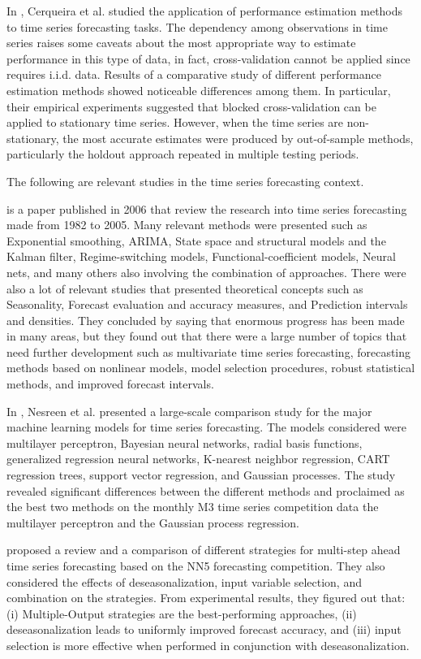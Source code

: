 In \cite{Cerqueira2020}, Cerqueira et al. studied the application of performance estimation methods to time series forecasting tasks.
The dependency among observations in time series raises some caveats about the most appropriate way to estimate performance in this type of data, in fact, cross-validation cannot be applied since requires i.i.d. data.
Results of a comparative study of different performance estimation methods showed noticeable differences among them.
In particular, their empirical experiments suggested that blocked cross-validation can be applied to stationary time series.
However, when the time series are non-stationary, the most accurate estimates were produced by out-of-sample methods, particularly the holdout approach repeated in multiple testing periods.

The following are relevant studies in the time series forecasting context.

\cite{DEGOOIJER2006443} is a paper published in 2006 that review the research into time series forecasting made from 1982 to 2005.
Many relevant methods were presented such as Exponential smoothing, ARIMA, State space and structural models and the Kalman filter, Regime-switching models, Functional-coefficient models, Neural nets, and many others also involving the combination of approaches.
There were also a lot of relevant studies that presented theoretical concepts such as Seasonality, Forecast evaluation and accuracy measures, and Prediction intervals and densities.
They concluded by saying that enormous progress has been made in many areas, but they found out that there were a large number of topics that need further development such as multivariate time series forecasting, forecasting methods based on nonlinear models, model selection procedures, robust statistical methods, and improved forecast intervals.

In \cite{Nesreen2010}, Nesreen et al. presented a large-scale comparison study for the major machine learning models for time series forecasting.
The models considered were multilayer perceptron, Bayesian neural networks, radial basis functions, generalized regression neural networks, K-nearest neighbor regression, CART regression trees, support vector regression, and Gaussian processes.
The study revealed significant differences between the different methods and proclaimed as the best two methods on the monthly M3 time series competition data the multilayer perceptron and the Gaussian process regression.

\cite{BENTAIEB20127067} proposed a review and a comparison of different strategies for multi-step ahead time series forecasting based on the NN5 forecasting competition.
They also considered the effects of deseasonalization, input variable selection, and combination on the strategies.
From experimental results, they figured out that:
(i) Multiple-Output strategies are the best-performing approaches,
(ii) deseasonalization leads to uniformly improved forecast accuracy,
and (iii) input selection is more effective when performed in conjunction with deseasonalization.

